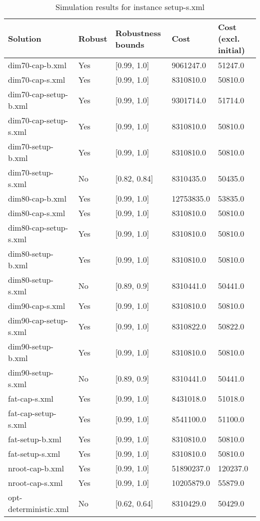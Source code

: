 \begin{table}[!hbp]
\label{tab:instance7_results}
\begin{tabular}{lllll}
\hline
Solution 	& Robust  	& Robustness bounds 	& Cost 	& Cost (excl. initial) \\
\hline
\hline
dim70-cap-b.xml 	& Yes 	&  [0.99, 1.0] 	& 9061247.0 	& 51247.0\\
dim70-cap-s.xml 	& Yes 	&  [0.99, 1.0] 	& 8310810.0 	& 50810.0\\
dim70-cap-setup-b.xml 	& Yes 	&  [0.99, 1.0] 	& 9301714.0 	& 51714.0\\
dim70-cap-setup-s.xml 	& Yes 	&  [0.99, 1.0] 	& 8310810.0 	& 50810.0\\
dim70-setup-b.xml 	& Yes 	&  [0.99, 1.0] 	& 8310810.0 	& 50810.0\\
dim70-setup-s.xml 	& No 	&  [0.82, 0.84] 	& 8310435.0 	& 50435.0\\
dim80-cap-b.xml 	& Yes 	&  [0.99, 1.0] 	& 12753835.0 	& 53835.0\\
dim80-cap-s.xml 	& Yes 	&  [0.99, 1.0] 	& 8310810.0 	& 50810.0\\
dim80-cap-setup-s.xml 	& Yes 	&  [0.99, 1.0] 	& 8310810.0 	& 50810.0\\
dim80-setup-b.xml 	& Yes 	&  [0.99, 1.0] 	& 8310810.0 	& 50810.0\\
dim80-setup-s.xml 	& No 	&  [0.89, 0.9] 	& 8310441.0 	& 50441.0\\
dim90-cap-s.xml 	& Yes 	&  [0.99, 1.0] 	& 8310810.0 	& 50810.0\\
dim90-cap-setup-s.xml 	& Yes 	&  [0.99, 1.0] 	& 8310822.0 	& 50822.0\\
dim90-setup-b.xml 	& Yes 	&  [0.99, 1.0] 	& 8310810.0 	& 50810.0\\
dim90-setup-s.xml 	& No 	&  [0.89, 0.9] 	& 8310441.0 	& 50441.0\\
fat-cap-s.xml 	        & Yes 	&  [0.99, 1.0] 	& 8431018.0 	& 51018.0\\
fat-cap-setup-s.xml 	& Yes 	&  [0.99, 1.0] 	& 8541100.0 	& 51100.0\\
fat-setup-b.xml 	& Yes 	&  [0.99, 1.0] 	& 8310810.0 	& 50810.0\\
fat-setup-s.xml 	& Yes 	&  [0.99, 1.0] 	& 8310810.0 	& 50810.0\\
nroot-cap-b.xml 	& Yes 	&  [0.99, 1.0] 	& 51890237.0 	& 120237.0\\
nroot-cap-s.xml 	& Yes 	&  [0.99, 1.0] 	& 10205879.0 	& 55879.0\\
opt-deterministic.xml 	& No 	&  [0.62, 0.64] & 8310429.0 	& 50429.0\\
\hline
\end{tabular}
\caption{Simulation results for instance setup-s.xml}
\end{table}

